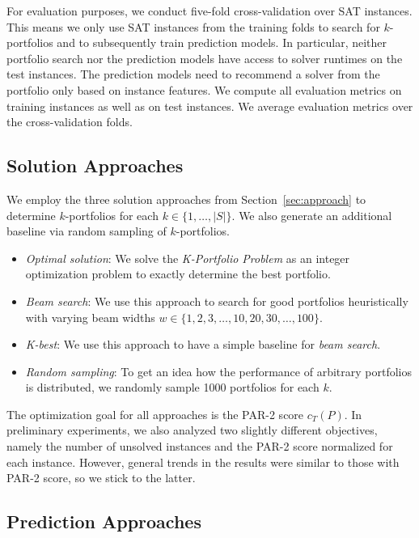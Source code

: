 \documentclass[a4paper,USenglish,pdfa]{lipics-v2021} %
\begin{document}
For evaluation purposes, we conduct five-fold cross-validation over SAT instances.
This means we only use SAT instances from the training folds to search for $k$-portfolios and to subsequently train prediction models.
In particular, neither portfolio search nor the prediction models have access to solver runtimes on the test instances.
The prediction models need to recommend a solver from the portfolio only based on instance features.
We compute all evaluation metrics on training instances as well as on test instances.
We average evaluation metrics over the cross-validation folds.

\subsection{Solution Approaches}

We employ the three solution approaches from Section~\ref{sec:approach} to determine $k$-portfolios for each $k \in \{1, \dots, |S|\}$. 
We also generate an additional baseline via random sampling of $k$-portfolios.

\begin{itemize}
	\item \emph{Optimal solution}:
	We solve the \emph{K-Portfolio Problem} as an integer optimization problem to exactly determine the best portfolio.
	\item \emph{Beam search}: 
	We use this approach to search for good portfolios heuristically with varying beam widths $w \in \{1, 2, 3, \dots, 10, 20, 30, \dots, 100\}$.
	\item \emph{K-best}:
	We use this approach to have a simple baseline for \emph{beam search}.
	\item \emph{Random sampling}:
	To get an idea how the performance of arbitrary portfolios is distributed, we randomly sample 1000 portfolios for each $k$.
\end{itemize}

The optimization goal for all approaches is the PAR-2 score $c_T(P)$.
In preliminary experiments, we also analyzed two slightly different objectives, namely the number of unsolved instances and the PAR-2 score normalized for each instance.
However, general trends in the results were similar to those with PAR-2 score, so we stick to the latter.

\subsection{Prediction Approaches}
\end{document}
